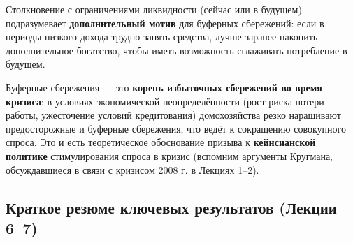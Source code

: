 \documentclass[10pt,a4paper]{article}
\begin{document}
\begin{intuition}
Столкновение с ограничениями ликвидности (сейчас или в будущем) подразумевает \textbf{дополнительный мотив} для буферных сбережений: если в периоды низкого дохода трудно занять средства, лучше заранее накопить дополнительное богатство, чтобы иметь возможность сглаживать потребление в будущем.

Буферные сбережения — это \textbf{корень избыточных сбережений во время кризиса}: в условиях экономической неопределённости (рост риска потери работы, ужесточение условий кредитования) домохозяйства резко наращивают предосторожные и буферные сбережения, что ведёт к сокращению совокупного спроса. Это и есть теоретическое обоснование призыва к \textbf{кейнсианской политике} стимулирования спроса в кризис (вспомним аргументы Кругмана, обсуждавшиеся в связи с кризисом 2008 г. в Лекциях 1--2).
\end{intuition}

\subsection{Краткое резюме ключевых результатов (Лекции 6--7)}
\end{document}
